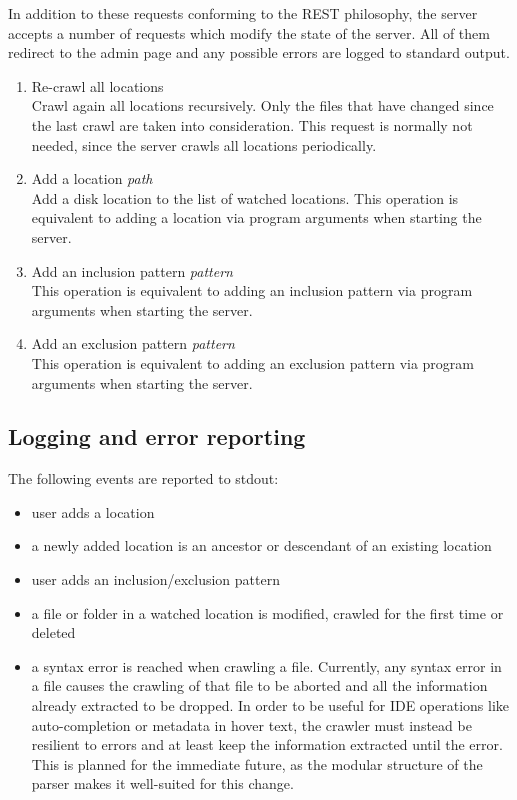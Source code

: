 In addition to these requests conforming to the REST philosophy, the server accepts a number of requests which modify the state of the server. All of them redirect to the admin page and any possible errors are logged to standard output.

\begin{enumerate}
\item Re-crawl all locations  \qquad  {} \\
	Crawl again all locations recursively. Only the files that have changed since the last crawl are taken into consideration. This request is normally not needed, since the server crawls all locations periodically.

\item Add a location  \qquad  {}\textit{path} \\
	Add a disk location to the list of watched locations. This operation is equivalent to adding a location via program arguments when starting the server.

\item Add an inclusion pattern  \qquad  {}\textit{pattern} \\
	This operation is equivalent to adding an inclusion pattern via program arguments when starting the server.

\item Add an exclusion pattern  \qquad  {}\textit{pattern} \\
	This operation is equivalent to adding an exclusion pattern via program arguments when starting the server.
\end{enumerate}




\subsection{Logging and error reporting}

The following events are reported to stdout:
\begin{itemize}
\item user adds a location
\item a newly added location is an ancestor or descendant of an existing location
\item user adds an inclusion/exclusion pattern
\item a file or folder in a watched location is modified, crawled for the first time or deleted
\item a syntax error is reached when crawling a file. Currently, any syntax error in a file causes the crawling of that file to be aborted and all the information already extracted to be dropped. In order to be useful for IDE operations like auto-completion or metadata in hover text, the crawler must instead be resilient to errors and at least keep the information extracted until the error. This is planned for the immediate future, as the modular structure of the parser makes it well-suited for this change.
\end{itemize}


